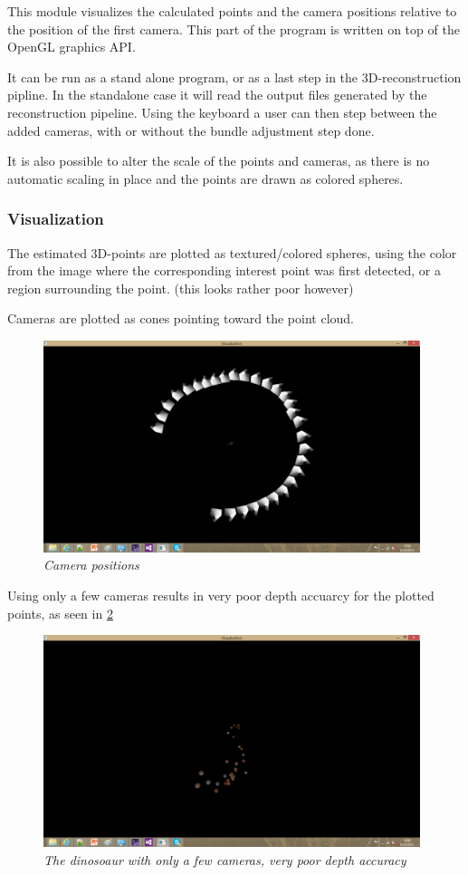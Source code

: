 This module visualizes the calculated points and the camera positions relative to the position of the first camera. This part of the program is written on top of the OpenGL graphics API.

It can be run as a stand alone program, or as a last step in the 3D-reconstruction pipline. In the standalone case it will read the output files generated by the reconstruction pipeline. Using the keyboard a user can then step between the added cameras, with or without the bundle adjustment step done.

It is also possible to alter the scale of the points and cameras, as there is no automatic scaling in place and the points are drawn as colored spheres.

\subsubsection{Visualization}
The estimated 3D-points are plotted as textured/colored spheres, using the color from the image where the corresponding interest point was first detected, or a region surrounding the point. (this looks rather poor however)

Cameras are plotted as cones pointing toward the point cloud.

\begin{figure}[htb]
	\centering
	\includegraphics[width=110mm]{images/camRingLots.png}
	\caption{\textit{Camera positions}}
	\label{fig:camRingLots}  %
\end{figure}

Using only a few cameras results in very poor depth accuarcy for the plotted points, as seen in 
\ref{fig:camRingFew}

\begin{figure}[htb]
	\centering
	\includegraphics[width=110mm]{images/pointCloudFewCam.png}
	\caption{\textit{The dinosoaur with only a few cameras, very poor depth accuracy}}
	\label{fig:camRingFew}  %
\end{figure}

